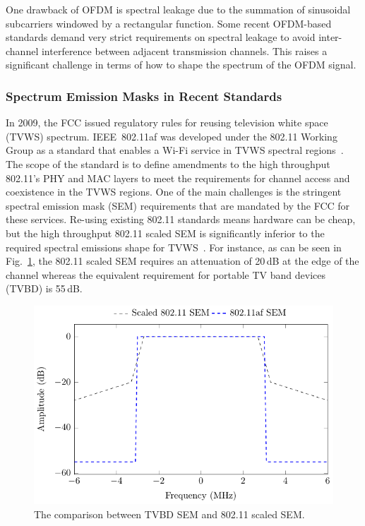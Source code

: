 One drawback of OFDM is spectral leakage due to the summation of sinusoidal subcarriers windowed by a rectangular function.
Some recent OFDM-based standards demand very strict requirements on spectral leakage to avoid inter-channel interference between adjacent transmission channels.
This raises a significant challenge in terms of how to shape the spectrum of the OFDM signal.

\subsubsection{Spectrum Emission Masks in Recent Standards}
In 2009, the FCC issued regulatory rules for reusing television white space (TVWS) spectrum.
IEEE~802.11af was developed under the 802.11 Working Group as a standard that enables a Wi-Fi service in TVWS spectral regions~\cite{802-11af2013}.
The scope of the standard is to define amendments to the high throughput 802.11's PHY and MAC layers to meet the requirements for channel access and coexistence in the TVWS regions.
One of the main challenges is the stringent spectral emission mask (SEM) requirements that are mandated by the FCC for these services.
Re-using existing 802.11 standards means hardware can be cheap, but the high throughput 802.11 scaled SEM is significantly inferior to the required spectral emissions shape for TVWS~\cite{Shellhammer2009}.
For instance, as can be seen in Fig.~\ref{fig:SEMCompare}, the 802.11 scaled SEM requires an attenuation of 20\,dB at the edge of the channel whereas the equivalent requirement for portable TV band devices (TVBD) is 55\,dB.

\begin{figure}
	\centerline{\includegraphics [width=0.7\columnwidth] {figures/802_11a_afSEM.pdf} }
	\caption{The comparison between TVBD SEM and 802.11 scaled SEM.}
	\label{fig:SEMCompare}
\end{figure}

